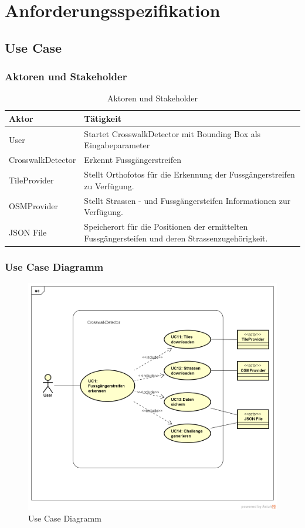 \section{Anforderungsspezifikation}
\subsection{Use Case}
\subsubsection{Aktoren und Stakeholder}
\begin{table}[H]
\centering
    \begin{tabular}{|p{3cm}|p{9cm}|}
    \hline
    \rowcolor{lightblue}
    Aktor & Tätigkeit   \\ \hline
	User  & Startet CrosswalkDetector mit Bounding Box als Eingabeparameter \\ \hline
	CrosswalkDetector & Erkennt Fussgängerstreifen \\ \hline 
	TileProvider & Stellt Orthofotos für die Erkennung der Fussgängerstreifen zu Verfügung.\\ \hline
	OSMProvider & Stellt Strassen - und Fussgängersteifen Informationen zur Verfügung. \\ \hline
	JSON File & Speicherort für die Positionen der ermittelten Fussgängersteifen und deren Strassenzugehörigkeit.\\ \hline
    \end{tabular}
    \caption[Aktoren und Stakeholder]{Aktoren und Stakeholder}
\end{table}

\subsubsection{Use Case Diagramm}
\begin{figure}[H]
\centering
\includegraphics[width=420pt]{images/UseCase.png}
\caption[Use Case Diagramm]{Use Case Diagramm}
\end{figure}

